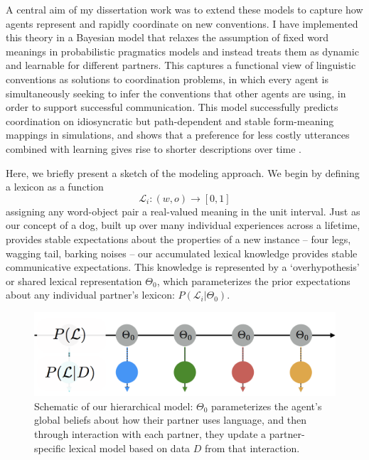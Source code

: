 \documentclass[11pt]{article}
\begin{document}
A central aim of my dissertation work was to extend these models to capture how agents represent and rapidly coordinate on new conventions.%
I have implemented this theory in a Bayesian model that relaxes the assumption of fixed word meanings in probabilistic pragmatics models and instead treats them as dynamic and learnable for different partners. 
This captures a functional view of linguistic conventions as solutions to coordination problems, in which every agent is simultaneously seeking to infer the conventions that other agents are using, in order to support successful communication. 
This model successfully predicts coordination on idiosyncratic but path-dependent and stable form-meaning mappings in simulations, and shows that a preference for less costly utterances combined with learning gives rise to shorter descriptions over time {\color{Red} \textbf{}}. 


Here, we briefly present a sketch of the modeling approach. We begin by defining a lexicon as a function $$\mathcal{L}_i: (w, o) \rightarrow [0,1]$$ assigning any word-object pair a real-valued meaning in the unit interval. Just as our concept of a dog, built up over many individual experiences across a lifetime, provides stable expectations about the properties of a new instance -- four legs, wagging tail, barking noises -- our accumulated lexical knowledge provides stable communicative expectations. 
This knowledge is represented by a `overhypothesis' or shared lexical representation $\Theta_0$, which parameterizes the prior expectations about any individual partner's lexicon: $P(\mathcal{L}_i | \Theta_0)$. 

\begin{figure}[b]
\centering
\includegraphics[scale=.4]{model_schematic.png}
\caption{Schematic of our hierarchical model: $\Theta_0$ parameterizes the agent's global beliefs about how their partner uses language, and then through interaction with each partner, they update a partner-specific lexical model based on data $D$ from that interaction.}
\label{fig:modelschematic}
\end{figure}
\end{document}
